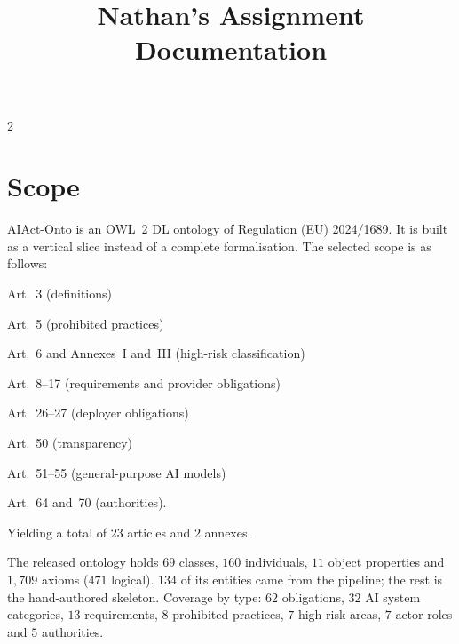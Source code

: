 \documentclass[10pt,a4paper]{article}
\title{\vspace{-2cm}\textbf{Nathan's Assignment Documentation}}
\date{\vspace{-1cm}}
\begin{document}
\maketitle
\vspace{-0.8cm}

\begin{multicols}{2}

\section{Scope}

AIAct-Onto is an OWL~2 DL ontology of Regulation (EU) 2024/1689.
It is built as a vertical slice instead of a complete formalisation.
The selected scope is as follows:
\begin{enumerate*}[label=\textbf{(\arabic*)},itemjoin={{; }},itemjoin*={{; and }}]
      \item Art.~3 (definitions)
      \item Art.~5 (prohibited practices)
      \item Art.~6 and Annexes~I and~III (high-risk classification)
      \item Art.~8--17 (requirements and provider obligations)
      \item Art.~26--27 (deployer obligations)
      \item Art.~50 (transparency)
      \item Art.~51--55 (general-purpose AI models)
      \item Art.~64 and~70 (authorities).
\end{enumerate*}
Yielding a total of $23$ articles and $2$ annexes.

The released ontology holds $69$ classes, $160$ individuals, $11$ object properties and $1{,}709$ axioms ($471$ logical).
$134$ of its entities came from the pipeline; the rest is the hand-authored skeleton.
Coverage by type: $62$ obligations, $32$ AI system categories, $13$ requirements, $8$ prohibited practices, $7$ high-risk areas, $7$ actor roles and $5$ authorities.


\end{multicols}
\end{document}
